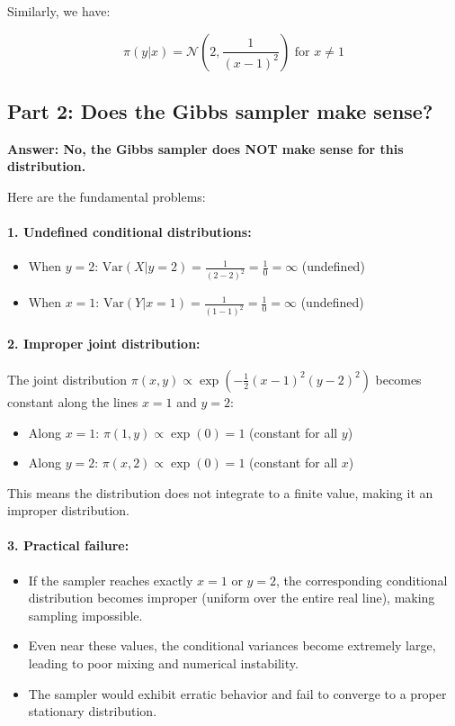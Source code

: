 Similarly, we have:

\begin{equation*}
\pi(y|x) = \mathcal{N}\left(2, \frac{1}{(x-1)^2}\right) \text{ for } x \neq 1
\end{equation*}

\subsection*{Part 2: Does the Gibbs sampler make sense?}

\textbf{Answer: No, the Gibbs sampler does NOT make sense for this distribution.}

Here are the fundamental problems:

\paragraph{1. Undefined conditional distributions:}
\begin{itemize}
\item When $y = 2$: $\text{Var}(X|y=2) = \frac{1}{(2-2)^2} = \frac{1}{0} = \infty$ (undefined)
\item When $x = 1$: $\text{Var}(Y|x=1) = \frac{1}{(1-1)^2} = \frac{1}{0} = \infty$ (undefined)
\end{itemize}

\paragraph{2. Improper joint distribution:}
The joint distribution $\pi(x,y) \propto \exp\left(-\frac{1}{2}(x-1)^2(y-2)^2\right)$ becomes constant along the lines $x = 1$ and $y = 2$:
\begin{itemize}
\item Along $x = 1$: $\pi(1,y) \propto \exp(0) = 1$ (constant for all $y$)
\item Along $y = 2$: $\pi(x,2) \propto \exp(0) = 1$ (constant for all $x$)
\end{itemize}

This means the distribution does not integrate to a finite value, making it an improper distribution.

\paragraph{3. Practical failure:}
\begin{itemize}
\item If the sampler reaches exactly $x = 1$ or $y = 2$, the corresponding conditional distribution becomes improper (uniform over the entire real line), making sampling impossible.
\item Even near these values, the conditional variances become extremely large, leading to poor mixing and numerical instability.
\item The sampler would exhibit erratic behavior and fail to converge to a proper stationary distribution.
\end{itemize}

